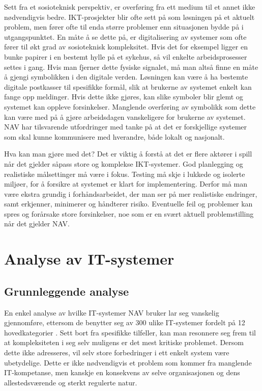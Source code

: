 \documentclass[informationsecurity]{gucmasterproject}
\begin{document}
Sett fra et sosioteknisk perspektiv, er overføring fra ett medium til et annet ikke nødvendigvis bedre. IKT-prosjekter blir ofte sett på som løsningen på et aktuelt problem, men fører ofte til enda større problemer enn situasjonen bydde på i utgangspunktet. En måte å se dette på, er digitalisering av systemer som ofte fører til økt grad av sosioteknisk kompleksitet. Hvis det for eksempel ligger en bunke papirer i en bestemt hylle på et sykehus, så vil enkelte arbeidsprosesser settes i gang. Hvis man fjerner dette fysiske signalet, må man altså finne en måte å gjengi symbolikken i den digitale verden. Løsningen kan være å ha bestemte digitale postkasser til spesifikke formål, slik at brukerne av systemet enkelt kan fange opp meldinger. Hvis dette ikke gjøres, kan slike symboler blir glemt og systemet kan oppleve forsinkelser. Manglende overføring av symbolikk som dette kan være med på å gjøre arbeidsdagen vanskeligere for brukerne av systemet. NAV har tilsvarende utfordringer med tanke på at det er forskjellige systemer som skal kunne kommunisere med hverandre, både lokalt og nasjonalt.

Hva kan man gjøre med det?
Det er viktig å forstå at det er flere aktører i spill når det gjelder såpass store og komplekse IKT-systemer. God planlegging og realistiske målsettinger må være i fokus. Testing må skje i lukkede og isolerte miljøer, for å forsikre at systemet er klart for implementering.
Derfor må man være ekstra grundig i forhåndsarbeidet, der man ser på mer realistiske endringer, samt erkjenner, minimerer og håndterer risiko. Eventuelle feil og problemer kan spres og forårsake store forsinkelser, noe som er en svært aktuell problemstilling når det gjelder NAV.




\chapter{Analyse av IT-systemer}
\section{Grunnleggende analyse}
En enkel analyse av hvilke IT-systemer NAV bruker lar seg vanskelig gjennomføre, ettersom de benytter seg av 300 ulike IT-systemer fordelt på 12 hovedkategorier \cite{sokelys}. Sett bort fra spesifikke tilfeller, kan man resonnere seg frem til at kompleksiteten i seg selv muligens er det mest kritiske problemet. Dersom dette ikke adresseres, vil selv store forbedringer i ett enkelt system være ubetydelige. Dette er ikke nødvendigvis et problem som kommer fra manglende IT-kompetanse, men kanskje en konsekvens av selve organisasjonen og dens allestedsværende og sterkt regulerte natur.
\end{document}
